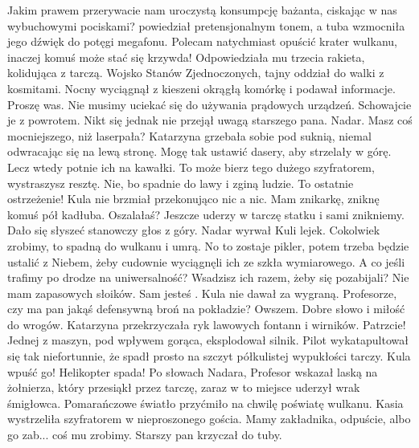 \begin{dialogue}
\ds{} Jakim prawem przerywacie nam uroczystą konsumpcję bażanta, ciskając w nas wybuchowymi pociskami? \dm{}
powiedział pretensjonalnym tonem, a tuba wzmocniła jego dźwięk do potęgi megafonu. \dm{}
Polecam natychmiast opuścić krater wulkanu, inaczej komuś może stać się krzywda! \dm{} Odpowiedziała mu trzecia rakieta, kolidująca z tarczą.
\ds{} Wojsko Stanów Zjednoczonych, tajny oddział do walki z kosmitami. \dm{} Nocny wyciągnął z kieszeni okrągłą komórkę i podawał informacje.
\ds{} Proszę was. Nie musimy uciekać się do używania prądowych urządzeń. Schowajcie je z powrotem. \dm{} Nikt się jednak nie przejął uwagą starszego pana.
\ds{} Nadar. Masz coś mocniejszego, niż laserpała? \dm{} Katarzyna grzebała sobie pod suknią, niemal odwracając się na lewą stronę.
\ds{} Mogę tak ustawić dasery, aby strzelały w górę. Lecz wtedy potnie ich na kawałki.
\ds{} To może bierz tego dużego szyfratorem, wystraszysz resztę.
\ds{} Nie, bo spadnie do lawy i zginą ludzie.
\ds{} To ostatnie ostrzeżenie! \dm{} Kula nie brzmiał przekonująco nic a nic.
\ds{} Mam znikarkę, zniknę komuś pół kadłuba.
\ds{} Oszalałaś? Jeszcze uderzy w tarczę statku i sami znikniemy.
\ds{}  \dm{} Dało się słyszeć stanowczy głos z góry.
\ds{}  \dm{} Nadar wyrwał Kuli lejek.
\ds{} Cokolwiek zrobimy, to spadną do wulkanu i umrą.
\ds{} No to zostaje pikler, potem trzeba będzie ustalić z Niebem, żeby cudownie wyciągnęli ich ze szkła wymiarowego.
\ds{} A co jeśli trafimy po drodze na uniwersalność? Wsadzisz ich razem, żeby się pozabijali? Nie mam zapasowych słoików.
\ds{} 
\ds{} Sam jesteś . \dm{} Kula nie dawał za wygraną.
\ds{} Profesorze, czy ma pan jakąś defensywną broń na pokładzie?
\ds{} Owszem. Dobre słowo i miłość do wrogów.
\ds{} 
\ds{}  \dm{} Katarzyna przekrzyczała ryk lawowych fontann i wirników.
\ds{} Patrzcie! \dm{} Jednej z maszyn, pod wpływem gorąca, eksplodował silnik. Pilot wykatapultował się tak niefortunnie, że spadł prosto na szczyt półkulistej wypukłości tarczy.
\ds{} Kula wpuść go! Helikopter spada! \dm{} Po słowach Nadara, Profesor wskazał laską na żołnierza, który przesiąkł przez tarczę, zaraz w to miejsce uderzył wrak śmigłowca. 
Pomarańczowe światło przyćmiło na chwilę poświatę wulkanu. Kasia wystrzeliła szyfratorem w nieproszonego gościa.
\ds{} Mamy zakładnika, odpuście, albo go zab... coś mu zrobimy. \dm{} Starszy pan krzyczał do tuby.

\end{dialogue}
